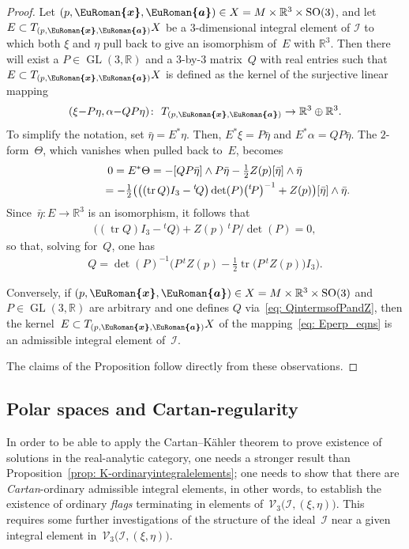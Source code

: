 \documentclass[pdftex]{sigma}
\numberwithin{equation}{section}
\newcommand{\eurom}{\EuRoman}
\newcommand{\cI}{{\mathcal I}}
\newcommand{\cV}{{\mathcal V}}
\newcommand{\bbR}{{\mathbb R}}
\newcommand{\GL}{\operatorname{GL}}
\newcommand{\SO}{\operatorname{SO}}
\newcommand{\euroa}{\bm{\eurom{a}}}
\newcommand{\eurox}{\bm{\eurom{x}}}
\DeclareMathOperator{\tr}{tr}
\begin{document}
\begin{proof}
Let $(p,\eurox,\euroa)\in X=M\times\bbR^3\times\SO(3)$, and
let $E\subset T_{(p,\eurox,\euroa)} X$ be a $3$-dimensional integral element of $\cI$
to which both $\xi$ and $\eta$ pull back to give an isomorphism of~$E$
with $\mathbb{R}^3$. Then there will exist a $P\in\GL(3,\bbR)$
and a $3$-by-$3$ matrix~$Q$ with real entries
such that $E\subset T_{(p,\eurox,\euroa)} X$ is defined as the kernel of the surjective linear mapping
\begin{gather}\label{eq: Eperp_eqns}
(\xi{-}P \eta, \alpha{-}QP \eta)\colon \ T_{(p,\eurox,\euroa)}\to\bbR^3\oplus\bbR^3.
\end{gather}
To simplify the notation, set $\bar\eta = E^*\eta$.
Then, $E^*\xi = P\bar\eta$ and $E^*\alpha = QP\bar\eta$.
The $2$-form~$\Theta$, which vanishes
when pulled back to~$E$, becomes
\begin{gather*}
0 = E^*\Theta= -[QP \bar\eta]\wedge P \bar\eta-\tfrac12 Z(p) [\bar\eta]\wedge\bar\eta\\
\hphantom{0 = E^*\Theta}{} = -\tfrac12\bigl(\bigl((\tr Q)I_3-{}^t\!Q\bigr)\det(P)\big({}^t\!P\big)^{-1}
 + Z(p)\bigr) [\bar\eta]\wedge\bar\eta.
\end{gather*}
Since~$\bar\eta:E\to\bbR^3$ is an isomorphism, it follows that
\begin{gather*}
\bigl((\tr Q)I_3 - {}^t\!Q\bigr) + Z(p) \,{}^t\!P/\det(P) = 0,
\end{gather*}
so that, solving for~$Q$, one has
\begin{gather}\label{eq: QintermsofPandZ}
Q = \det(P)^{-1}\big(P \, {}^t\!Z(p) - \tfrac12 \tr\bigl(P\, {}^t\!Z(p)\bigr) I_3\big).
\end{gather}

Conversely, if $(p,\eurox,\euroa)\in X=M\times\bbR^3\times\SO(3)$
and~$P\in\GL(3,\bbR)$ are arbitrary
and one defines $Q$ via~\eqref{eq: QintermsofPandZ},
then the kernel~$E\subset T_{(p,\eurox,\euroa)}X$
of the mapping~\eqref{eq: Eperp_eqns}
is an admissible integral element of~$\cI$.

The claims of the Proposition follow directly from these observations.
\end{proof}

\subsection{Polar spaces and Cartan-regularity}
In order to be able to apply the Cartan--K\"ahler theorem to prove existence of solutions in the real-analytic category, one needs a stronger result than Proposition~\ref{prop: K-ordinaryintegralelements}; one needs to show that there are \emph{Cartan}-ordinary admissible integral elements, in other words, to establish the existence of ordinary \emph{flags} terminating in elements of~$\cV_3\bigl(\cI,(\xi,\eta)\bigr)$. This requires some further investigations of the structure of the ideal~$\cI$ near a given integral element in~$\cV_3\bigl(\cI,(\xi,\eta)\bigr)$.
\end{document}

